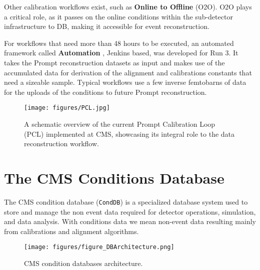 Other calibration workflows exist, such as \textbf{Online to Offline} (O2O). O2O plays a critical role, as it passes on the online conditions within the sub-detector infrastructure to DB, making it accessible for event reconstruction.

For workflows that need more than 48 hours to be executed, an automated framework called \textbf{Automation} \cite{Pigazzini:2853679}, Jenkins based, was developed for Run 3. It takes the Prompt reconstruction datasets as input and makes use of the accumulated data for derivation of the alignment and calibrations constants that need a sizeable sample. Typical workflows use a few inverse femtobarns of data for the uploads of the conditions to future Prompt reconstruction.  

\begin{figure}[h!]	
\centering
\texttt{[image: figures/PCL.jpg]} %
\caption{A schematic overview of the current Prompt Calibration Loop (PCL) implemented at CMS, showcasing its integral role to the data reconstruction workflow.} %
\label{fig:PCL}
\end{figure}

\section{The CMS Conditions Database}

The CMS condition database (\texttt{CondDB}) is a specialized database system used to store and manage the non event data required for detector operations, simulation, and data analysis. With conditions data we mean non-event data resulting mainly from calibrations and alignment algorithms.

\begin{figure}[h!]	
\centering
\texttt{[image: figures/figure\_DBArchitecture.png]} %
\caption{CMS condition databases architecture. \cite{Gruttola_2010}} 
\label{fig:CondDB}
\end{figure}

